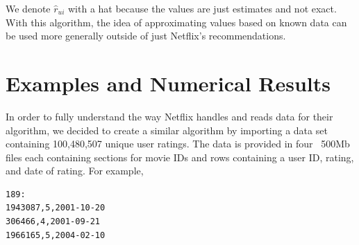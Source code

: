 \documentclass[11pt,a4paper]{article}
\begin{document}
We denote $\hat{r}_{ui}$ with a hat because the values are just estimates and not exact. With this algorithm, the idea of approximating values based on known data can be used more generally outside of just Netflix's recommendations.
\section{Examples and Numerical Results}


In order to fully understand the way Netflix handles and reads data for their algorithm, we decided to create a similar algorithm by importing a data set containing 100,480,507 unique user ratings. The data is provided in four ~500Mb files each containing sections for movie IDs and rows containing a user ID, rating, and date of rating. For example,

\begin{verbatim}
189:
1943087,5,2001-10-20
306466,4,2001-09-21
1966165,5,2004-02-10
\end{verbatim}
\end{document}

